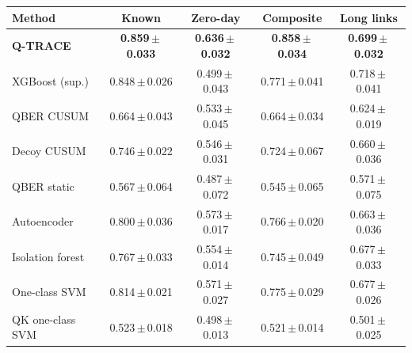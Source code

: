 \begin{tabular}{lcccc}
\toprule
Method & Known & Zero-day & Composite & Long links \\
\midrule
\textbf{Q-TRACE} & \textbf{0.859\,$\pm$\,0.033} & \textbf{0.636\,$\pm$\,0.032} & \textbf{0.858\,$\pm$\,0.034} & \textbf{0.699\,$\pm$\,0.032} \\
XGBoost (sup.) & 0.848\,$\pm$\,0.026 & 0.499\,$\pm$\,0.043 & 0.771\,$\pm$\,0.041 & 0.718\,$\pm$\,0.041 \\
QBER CUSUM & 0.664\,$\pm$\,0.043 & 0.533\,$\pm$\,0.045 & 0.664\,$\pm$\,0.034 & 0.624\,$\pm$\,0.019 \\
Decoy CUSUM & 0.746\,$\pm$\,0.022 & 0.546\,$\pm$\,0.031 & 0.724\,$\pm$\,0.067 & 0.660\,$\pm$\,0.036 \\
QBER static & 0.567\,$\pm$\,0.064 & 0.487\,$\pm$\,0.072 & 0.545\,$\pm$\,0.065 & 0.571\,$\pm$\,0.075 \\
Autoencoder & 0.800\,$\pm$\,0.036 & 0.573\,$\pm$\,0.017 & 0.766\,$\pm$\,0.020 & 0.663\,$\pm$\,0.036 \\
Isolation forest & 0.767\,$\pm$\,0.033 & 0.554\,$\pm$\,0.014 & 0.745\,$\pm$\,0.049 & 0.677\,$\pm$\,0.033 \\
One-class SVM & 0.814\,$\pm$\,0.021 & 0.571\,$\pm$\,0.027 & 0.775\,$\pm$\,0.029 & 0.677\,$\pm$\,0.026 \\
QK one-class SVM & 0.523\,$\pm$\,0.018 & 0.498\,$\pm$\,0.013 & 0.521\,$\pm$\,0.014 & 0.501\,$\pm$\,0.025 \\
\bottomrule
\end{tabular}
